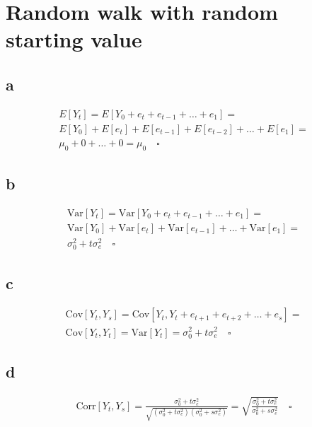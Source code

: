 \documentclass[]{book}
\theoremstyle{definition}
\theoremstyle{definition}
\theoremstyle{remark}
\begin{document}
\section{Random walk with random starting
value}\label{random-walk-with-random-starting-value}

\subsection*{a}\label{a-15}

\begin{gather*}
  E[Y_t] = E[Y_0+e_t+e_{t-1}+\dots+e_1] = \\
  E[Y_0] + E[e_t] + E[e_{t-1}] + E[e_{t-2}] + \dots + E[e_1] = \\
  \mu_0 + 0 + \dots + 0 = \mu_0 \quad \square
\end{gather*}

\subsection*{b}\label{b-15}

\begin{gather*}
  \text{Var}[Y_t] = \text{Var}[Y_0 + e_t + e_{t-1} + \dots + e_1] = \\
  \text{Var}[Y_0] + \text{Var}[e_t] + \text{Var}[e_{t-1}] + \dots + \text{Var}[e_1] = \\
  \sigma_0^2+t\sigma_e^2 \quad \square
\end{gather*}

\subsection*{c}\label{c-9}

\begin{gather*}
  \text{Cov}[Y_t, Y_s] = \text{Cov}[Y_t, Y_t+e_{t+1}+e_{t+2}+ \dots + e_s] = \\
  \text{Cov}[Y_t, Y_t] = \text{Var}[Y_t] = \sigma_0^2+t\sigma_e^2 \quad \square
\end{gather*}

\subsection*{d}\label{d}

\begin{gather*}
  \text{Corr}[Y_t, Y_s] = \frac{\sigma_0^2+t\sigma_e^2}{\sqrt{(\sigma_0^2+t\sigma_e^2)(\sigma_0^2+s\sigma_e^2)}} = 
    \sqrt{\frac{\sigma_0^2+t\sigma_e^2}{\sigma_0^2+s\sigma_e^2}} \quad \square
\end{gather*}
\end{document}
